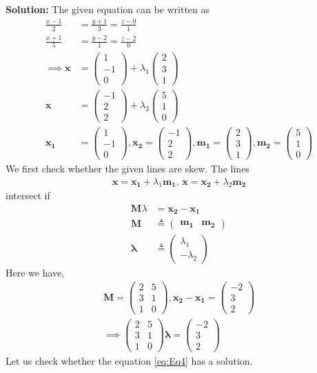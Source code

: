 \documentclass[12pt]{article}
\newcommand{\solution}{\noindent \textbf{Solution: }}
\newcommand{\myvec}[1]{\ensuremath{\begin{pmatrix}#1\end{pmatrix}}}
\let\vec\mathbf
\begin{document}
\begin{enumerate}
\solution 
The given equation can be written as
\begin{align}
	\label{eq:Eq1}
	\frac{x-1}{2} &= \frac{y+1}{3}=\frac{z-0}{1}\\ 
	\label{eq:Eq2}
	\frac{x+1}{5} &= \frac{y-2}{1}= \frac{z-2}{0} \\ 
	\implies 
	\vec{x} &= \myvec{1\\-1\\0} + \lambda_1\myvec{2\\3\\1}\\
        \vec{x} &= \myvec{-1\\2\\2} + \lambda_2\myvec{5\\1\\0} \\
	\vec{x_1} &= \myvec{1\\-1\\0},  
	\vec{x_2} = \myvec{-1\\2\\2},  
	\vec{m_1} = \myvec{2\\3\\1},
	\vec{m_2} = \myvec{5\\1\\0} 
\end{align}
We first check whether the given lines are skew. The lines 
\begin{align}
	\label{eq:Eq3}
	\vec{x} = \vec{x_1} + \lambda_1\vec{m_1},\, \vec{x} = \vec{x_2} + \lambda_2\vec{m_2} 
\end{align}
intersect if
\begin{align}
	\vec{M}{\lambda} &= \vec{x_2} - \vec{x_1}\\
	\vec{M} &\triangleq \myvec{\vec{m_1} & \vec{m_2}} \\
	\bm{\lambda} &\triangleq \myvec{\lambda_1\\-\lambda_2}
\end{align}
Here we have,
\begin{align}
	\vec{M} = \myvec{2&5\\3&1\\1&0},
	\vec{x_2} - \vec{x_1} = \myvec{-2\\3\\2}  \\
	\label{eq:Eq4}
        \implies \myvec{2&5\\3&1\\1&0}\bm{\lambda} = \myvec{-2\\3\\2}
\end{align}
Let us check whether the equation \eqref{eq:Eq4} has a solution.


\end{enumerate}
\end{document}
